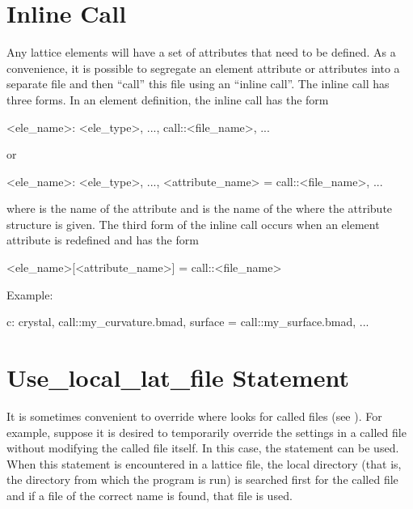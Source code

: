 {{%
\section{Inline Call}
\label{s:call.inline}

Any lattice elements will have a set of attributes that need to be defined.
As a convenience, it is possible to segregate an element attribute or attributes
into a separate file and then ``call'' this file using an
``inline call''. The inline call has three forms. In an element definition,
the inline call has the form
\begin{example}
  <ele_name>: <ele_type>, ..., call::<file_name>, ...
\end{example}
or
\begin{example}
  <ele_name>: <ele_type>, ..., <attribute_name> = call::<file_name>, ...
\end{example}
where  is the name of the attribute and
 is the name of the where the attribute structure is
given.  The third form of the inline call occurs when an element
attribute is redefined and has the form
\begin{example}
  <ele_name>[<attribute_name>] = call::<file_name>
\end{example}
Example:
\begin{example}
  c: crystal, call::my_curvature.bmad, surface = call::my_surface.bmad, ...
\end{example}  

\section{Use_local_lat_file Statement}
\label{s:use.loc}

It is sometimes convenient to override where \bmad looks for called
files (see ). For example, suppose it is desired to
temporarily override the settings in a called file without modifying
the called file itself. In this case, the 
statement can be used. When this statement is encountered in a lattice
file, the local directory (that is, the directory from which the
program is run) is searched first for the called file and if a file
of the correct name is found, that file is used.

}}
